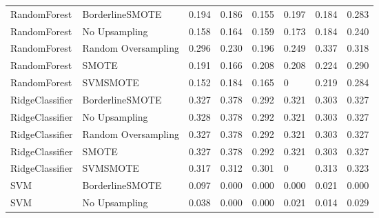 \begin{tabular}{llllllll}
                RandomForest &     BorderlineSMOTE & 0.194 &                     0.186 &                 0.155 &                  0.197 &                                   0.184 &     0.283 \\
                RandomForest &       No Upsampling & 0.158 &                     0.164 &                 0.159 &                  0.173 &                                   0.184 &     0.240 \\
                RandomForest & Random Oversampling & 0.296 &                     0.230 &                 0.196 &                  0.249 &                                   0.337 &     0.318 \\
                RandomForest &               SMOTE & 0.191 &                     0.166 &                 0.208 &                  0.208 &                                   0.224 &     0.290 \\
                RandomForest &            SVMSMOTE & 0.152 &                     0.184 &                 0.165 &                      0 &                                   0.219 &     0.284 \\
             RidgeClassifier &     BorderlineSMOTE & 0.327 &                     0.378 &                 0.292 &                  0.321 &                                   0.303 &     0.327 \\
             RidgeClassifier &       No Upsampling & 0.328 &                     0.378 &                 0.292 &                  0.321 &                                   0.303 &     0.327 \\
             RidgeClassifier & Random Oversampling & 0.327 &                     0.378 &                 0.292 &                  0.321 &                                   0.303 &     0.327 \\
             RidgeClassifier &               SMOTE & 0.327 &                     0.378 &                 0.292 &                  0.321 &                                   0.303 &     0.327 \\
             RidgeClassifier &            SVMSMOTE & 0.317 &                     0.312 &                 0.301 &                      0 &                                   0.313 &     0.323 \\
                         SVM &     BorderlineSMOTE & 0.097 &                     0.000 &                 0.000 &                  0.000 &                                   0.021 &     0.000 \\
                         SVM &       No Upsampling & 0.038 &                     0.000 &                 0.000 &                  0.021 &                                   0.014 &     0.029 \\

\end{tabular}

